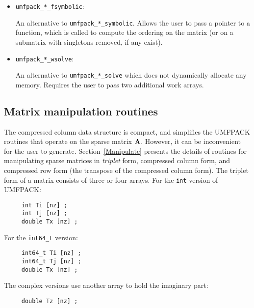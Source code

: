 \documentclass[11pt]{article}
\newcommand{\m}[1]{{\bf{#1}}}       %
\begin{document}
\begin{itemize}
\item {\tt umfpack\_*\_fsymbolic}:

    An alternative to {\tt umfpack\_*\_symbolic}.
    Allows the user to pass a pointer to a function,
    which is called to compute the ordering on the matrix
    (or on a submatrix with singletons removed, if any exist).

\item {\tt umfpack\_*\_wsolve}:

    An alternative to {\tt umfpack\_*\_solve} which does not dynamically
    allocate any memory.  Requires the user to pass two additional work
    arrays.

\end{itemize}

\subsection{Matrix manipulation routines}
\label{triplet}

The compressed column data structure is compact, and simplifies the UMFPACK
routines that operate on the sparse matrix $\m{A}$.  However, it can be
inconvenient for the user to generate.  Section~\ref{Manipulate} presents the
details of routines for manipulating sparse matrices in {\em triplet} form,
compressed column form, and compressed row form (the transpose of the
compressed column form).  The triplet form of a matrix consists of three or
four arrays.  For the {\tt int} version of UMFPACK:

{\footnotesize
\begin{verbatim}
     int Ti [nz] ;
     int Tj [nz] ;
     double Tx [nz] ;
\end{verbatim}
}

For the \verb'int64_t' version:

{\footnotesize
\begin{verbatim}
     int64_t Ti [nz] ;
     int64_t Tj [nz] ;
     double Tx [nz] ;
\end{verbatim}
}

The complex versions use another array to hold the imaginary part:

{\footnotesize
\begin{verbatim}
     double Tz [nz] ;
\end{verbatim}
}
\end{document}
